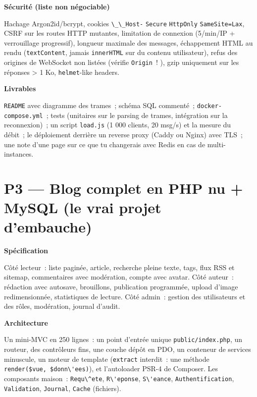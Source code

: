 \documentclass[12pt,a4paper,twoside,openright]{book}
\newcommand{\etape}[1]{\par\medskip\noindent\textbf{\large #1}\par\smallskip}
\begin{document}
\etape{S\'ecurit\'e (liste non n\'egociable)}
Hachage Argon2id/bcrypt, cookies \verb|\_\_Host-| \verb|Secure| \verb|HttpOnly| \verb|SameSite=Lax|,
CSRF sur les routes HTTP mutantes, limitation de connexion (5/min/IP + verrouillage progressif),
longueur maximale des messages, \'echappement HTML au rendu (\verb|textContent|, jamais
\verb|innerHTML| sur du contenu utilisateur), refus des origines de WebSocket non list\'ees
(v\'erifie \verb|Origin|~! ), gzip uniquement sur les r\'eponses > 1 Ko, \verb|helmet|-like headers.

\etape{Livrables}
\verb|README| avec diagramme des trames~; sch\'ema SQL comment\'e~; \verb|docker-compose.yml|~;
tests (unitaires sur le parsing de trames, int\'egration sur la reconnexion)~; un script
\verb|load.js| (1 000 clients, 20 msg/s) et la mesure du d\'ebit~; le d\'eploiement derri\`ere un reverse
proxy (Caddy ou Nginx) avec TLS~; une note d'une page sur ce que tu changerais avec Redis
en cas de multi-instances.

\section{P3 --- Blog complet en PHP nu + MySQL (le vrai projet d'embauche)}

\etape{Sp\'ecification}
C\^ot\'e lecteur~: liste pagin\'ee, article, recherche pleine texte, tags, flux RSS et sitemap,
commentaires avec mod\'eration, compte avec avatar. C\^ot\'e auteur~: r\'edaction avec autosave,
brouillons, publication programm\'ee, upload d'image redimensionn\'ee, statistiques de lecture.
C\^ot\'e admin~: gestion des utilisateurs et des r\^oles, mod\'eration, journal d'audit.

\etape{Architecture}
Un mini-MVC en 250 lignes~: un point d'entr\'ee unique \verb|public/index.php|, un routeur,
des contr\^oleurs fins, une couche d\'ep\^ot en PDO, un conteneur de services minuscule, un moteur de
template (\verb|extract| interdit~: une m\'ethode \verb|render($vue, $donn\'ees)|), et
l'autoloader PSR-4 de Composer. Les composants maison~: \verb|Requ\^ete|, \verb|R\'eponse|,
\verb|S\'eance|, \verb|Authentification|, \verb|Validation|, \verb|Journal|, \verb|Cache| (fichiers).
\end{document}
